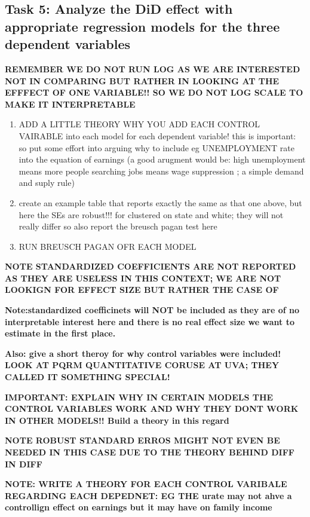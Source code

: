 \documentclass[a4paper]{article}
\begin{document}
\subsection{Task 5: Analyze the DiD effect with appropriate regression models for the three
dependent variables}

\textbf{REMEMBER WE DO NOT RUN LOG AS WE ARE INTERESTED NOT IN COMPARING BUT RATHER IN LOOKING AT THE EFFFECT OF ONE VARIABLE!! SO WE DO NOT LOG SCALE TO MAKE IT INTERPRETABLE}

\begin{enumerate}
   \item ADD A LITTLE THEORY WHY YOU ADD EACH CONTROL VAIRABLE into each model for each dependent variable! this is important: so put some effort into arguing why to include eg UNEMPLOYMENT rate into the equation of earnings (a good arugment would be: high unemployment means more people searching jobs means wage suppression ; a simple demand and suply rule)
   \item create an example table that reports exactly the same as that one above, but here the SEs are robust!!! for clustered on state and white; they will not really differ so also report the breusch pagan test here
   \item RUN BREUSCH PAGAN OFR EACH MODEL
\end{enumerate}


\textbf{NOTE STANDARDIZED COEFFICIENTS ARE NOT REPORTED AS THEY ARE USELESS IN THIS CONTEXT; WE ARE NOT LOOKIGN FOR EFFECT SIZE BUT RATHER THE CASE OF }


\textbf{Note:standardized coefficinets will NOT be included as they are of no interpretable interest here and there is no real effect size we want to estimate in the first place.}

\textbf{Also: give a short theroy for why control variables were included! LOOK AT PQRM QUANTITATIVE CORUSE AT UVA; THEY CALLED IT SOMETHING SPECIAL!}

\textbf{IMPORTANT: EXPLAIN WHY IN CERTAIN MODELS THE CONTROL VARIABLES WORK AND WHY THEY DONT WORK IN OTHER MODELS!! Build a theory in this regard }

\textbf{NOTE ROBUST STANDARD ERROS MIGHT NOT EVEN BE NEEDED IN THIS CASE DUE TO THE THEORY BEHIND DIFF IN DIFF }

\textbf{NOTE: WRITE A THEORY FOR EACH CONTROL VARIBALE REGARDING EACH DEPEDNET: EG THE urate may not ahve a controllign effect on earnings but it may have on family income }

\pagebreak
\end{document}
